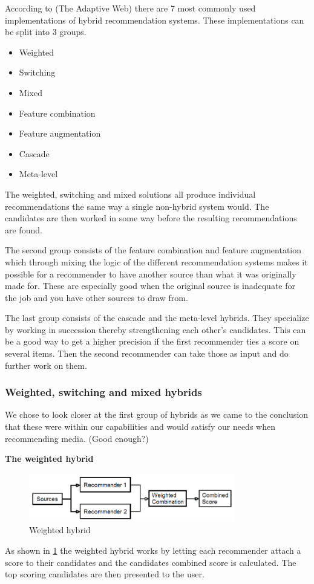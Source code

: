 According to (The Adaptive Web) there are 7 most commonly used implementations of hybrid recommendation systems. These implementations can be split into 3 groups.

\begin{itemize}
\item Weighted
\item Switching
\item Mixed
\item Feature combination
\item Feature augmentation
\item Cascade
\item Meta-level
\end{itemize}

The weighted, switching and mixed solutions all produce individual recommendations the same way a single non-hybrid system would. The candidates are then worked in some way before the resulting recommendations are found.

The second group consists of the feature combination and feature augmentation which through mixing the logic of the different recommendation systems makes it possible for a recommender to have another source than what it was originally made for. These are especially good when the original source is inadequate for the job and you have other sources to draw from.

The last group consists of the cascade and the meta-level hybrids. They specialize by working in succession thereby strengthening each other's candidates. This can be a good way to get a higher precision if the first recommender ties a score on several items. Then the second recommender can take those as input and do further work on them. 

\subsubsection{Weighted, switching and mixed hybrids} 
We chose to look closer at the first group of hybrids as we came to the conclusion that these were within our capabilities and would satisfy our needs when recommending media. (Good enough?)

\textbf{The weighted hybrid}
\begin{figure}[H]
\centering
\includegraphics[width=0.8\textwidth]{Images/Weighted hybrid.png}
\caption{Weighted hybrid}
\label{Weighted}
\end{figure}
As shown in \ref{Weighted} the weighted hybrid works by letting each recommender attach a score to their candidates and the candidates combined score is calculated. The top scoring candidates are then presented to the user. 

